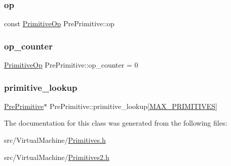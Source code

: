 \subsubsection{\texorpdfstring{op}{op}}
{\footnotesize\ttfamily const \hyperlink{_instruction_8h_a227278394efd1e2313c727102db09ea9}{Primitive\+Op} Pre\+Primitive\+::op}

\mbox{\label{struct_pre_primitive_a8f4088dc0a3fe00fd81c509bb0af1881}} 
\subsubsection{\texorpdfstring{op\+\_\+counter}{op\_counter}}
{\footnotesize\ttfamily \hyperlink{_instruction_8h_a227278394efd1e2313c727102db09ea9}{Primitive\+Op} Pre\+Primitive\+::op\+\_\+counter = 0\hspace{0.3cm}{\ttfamily [static]}}

\mbox{\label{struct_pre_primitive_a286cab59ea91d634e75f435cd9812dd1}} 
\subsubsection{\texorpdfstring{primitive\+\_\+lookup}{primitive\_lookup}}
{\footnotesize\ttfamily \hyperlink{struct_pre_primitive}{Pre\+Primitive}$\ast$ Pre\+Primitive\+::primitive\+\_\+lookup\mbox{[}\hyperlink{struct_pre_primitive_aaa931d0f215c4a79ab4920c13a82a32b}{M\+A\+X\+\_\+\+P\+R\+I\+M\+I\+T\+I\+V\+ES}\mbox{]}\hspace{0.3cm}{\ttfamily [static]}}



The documentation for this class was generated from the following files\+:\begin{DoxyCompactItemize}
\item 
src/\+Virtual\+Machine/\hyperlink{_primitives_8h}{Primitives.\+h}\item 
src/\+Virtual\+Machine/\hyperlink{_primitives2_8h}{Primitives2.\+h}\end{DoxyCompactItemize}
